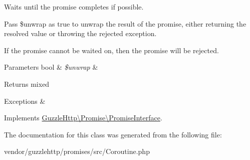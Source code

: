 Waits until the promise completes if possible.

Pass \$unwrap as true to unwrap the result of the promise, either returning the resolved value or throwing the rejected exception.

If the promise cannot be waited on, then the promise will be rejected.


\begin{DoxyParams}[1]{Parameters}
bool & {\em \$unwrap} & \\
\hline
\end{DoxyParams}
\begin{DoxyReturn}{Returns}
mixed 
\end{DoxyReturn}

\begin{DoxyExceptions}{Exceptions}
{\em } & \\
\hline
\end{DoxyExceptions}


Implements \hyperlink{interfaceGuzzleHttp_1_1Promise_1_1PromiseInterface_ad7f8dc7f9513af40c61a985ad89b6219}{Guzzle\+Http\textbackslash{}\+Promise\textbackslash{}\+Promise\+Interface}.



The documentation for this class was generated from the following file\+:\begin{DoxyCompactItemize}
\item 
vendor/guzzlehttp/promises/src/Coroutine.\+php\end{DoxyCompactItemize}
